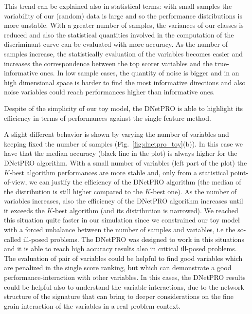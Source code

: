 \documentclass{standalone}
\begin{document}
This trend can be explained also in statistical terms: with small samples the variability of our (random) data is large and so the performance distributions is more unstable.
With a greater number of samples, the variances of our classes is reduced and also the statistical quantities involved in the computation of the discriminant curve can be evaluated with more accuracy.
As the number of samples increase, the statistically evaluation of the variables becomes easier and increases the correspondence between the top scorer variables and the true-informative ones.
In low sample cases, the quantity of noise is bigger and in an high dimensional space is harder to find the most informative directions and also noise variables could reach performances higher than informative ones.

Despite of the simplicity of our toy model, the \textsf{DNetPRO} is able to highlight its efficiency in terms of performances against the single-feature method.

A slight different behavior is shown by varying the number of variables and keeping fixed the number of samples (Fig.~\ref{fig:dnetpro_toy}(b)).
In this case we have that the median accuracy (black line in the plot) is always higher for the \textsf{DNetPRO} algorithm.
With a small number of variables (left part of the plot) the $K$-best algorithm performances are more stable and, only from a statistical point-of-view, we can justify the efficiency of the \textsf{DNetPRO} algorithm (the median of the distribution is still higher compared to the $K$-best one).
As the number of variables increases, also the efficiency of the \textsf{DNetPRO} algorithm increases until it exceeds the $K$-best algorithm (and its distribution is narrowed).
We reached this situation quite faster in our simulation since we constrained our toy model with a forced unbalance between the number of samples and variables, i.e the so-called ill-posed problems.
The \textsf{DNetPRO} was designed to work in this situations and it is able to reach high accuracy results also in critical ill-posed problems.
The evaluation of pair of variables could be helpful to find good variables which are penalized in the single score ranking, but which can demonstrate a good performance-interaction with other variables.
In this cases, the \textsf{DNetPRO} results could be helpful also to understand the variable interactions, due to the network structure of the signature that can bring to deeper considerations on the fine grain interaction of the variables in a real problem context.
\end{document}
